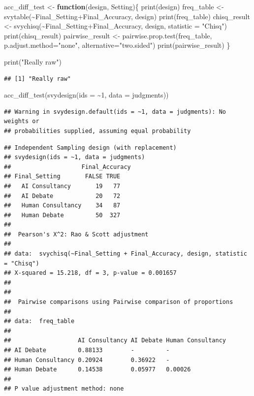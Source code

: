 \documentclass[
]{article}
\newenvironment{Shaded}{\begin{snugshade}}{\end{snugshade}}
\newcommand{\AttributeTok}[1]{\textcolor[rgb]{0.77,0.63,0.00}{#1}}
\newcommand{\ControlFlowTok}[1]{\textcolor[rgb]{0.13,0.29,0.53}{\textbf{#1}}}
\newcommand{\DecValTok}[1]{\textcolor[rgb]{0.00,0.00,0.81}{#1}}
\newcommand{\FunctionTok}[1]{\textcolor[rgb]{0.00,0.00,0.00}{#1}}
\newcommand{\NormalTok}[1]{#1}
\newcommand{\OtherTok}[1]{\textcolor[rgb]{0.56,0.35,0.01}{#1}}
\newcommand{\SpecialCharTok}[1]{\textcolor[rgb]{0.00,0.00,0.00}{#1}}
\newcommand{\StringTok}[1]{\textcolor[rgb]{0.31,0.60,0.02}{#1}}
\begin{document}
\begin{Shaded}
\begin{Highlighting}[]
\NormalTok{acc\_diff\_test }\OtherTok{\textless{}{-}} \ControlFlowTok{function}\NormalTok{(design, Setting)\{}
  \FunctionTok{print}\NormalTok{(design)}
\NormalTok{  freq\_table }\OtherTok{\textless{}{-}} \FunctionTok{svytable}\NormalTok{(}\SpecialCharTok{\textasciitilde{}}\NormalTok{Final\_Setting}\SpecialCharTok{+}\NormalTok{Final\_Accuracy, design)}
  \FunctionTok{print}\NormalTok{(freq\_table)}
\NormalTok{  chisq\_result }\OtherTok{\textless{}{-}} \FunctionTok{svychisq}\NormalTok{(}\SpecialCharTok{\textasciitilde{}}\NormalTok{Final\_Setting}\SpecialCharTok{+}\NormalTok{Final\_Accuracy, design, }\AttributeTok{statistic =} \StringTok{"Chisq"}\NormalTok{)}
  \FunctionTok{print}\NormalTok{(chisq\_result)}
\NormalTok{  pairwise\_result }\OtherTok{\textless{}{-}} \FunctionTok{pairwise.prop.test}\NormalTok{(freq\_table, }\AttributeTok{p.adjust.method=}\StringTok{"none"}\NormalTok{, }\AttributeTok{alternative=}\StringTok{"two.sided"}\NormalTok{)}
  \FunctionTok{print}\NormalTok{(pairwise\_result)}
\NormalTok{\}}

\FunctionTok{print}\NormalTok{(}\StringTok{"Really raw"}\NormalTok{)}
\end{Highlighting}
\end{Shaded}

\begin{verbatim}
## [1] "Really raw"
\end{verbatim}

\begin{Shaded}
\begin{Highlighting}[]
\FunctionTok{acc\_diff\_test}\NormalTok{(}\FunctionTok{svydesign}\NormalTok{(}\AttributeTok{ids =} \SpecialCharTok{\textasciitilde{}}\DecValTok{1}\NormalTok{, }\AttributeTok{data =}\NormalTok{ judgments))}
\end{Highlighting}
\end{Shaded}

\begin{verbatim}
## Warning in svydesign.default(ids = ~1, data = judgments): No weights or
## probabilities supplied, assuming equal probability
\end{verbatim}

\begin{verbatim}
## Independent Sampling design (with replacement)
## svydesign(ids = ~1, data = judgments)
##                    Final_Accuracy
## Final_Setting       FALSE TRUE
##   AI Consultancy       19   77
##   AI Debate            20   72
##   Human Consultancy    34   87
##   Human Debate         50  327
## 
##  Pearson's X^2: Rao & Scott adjustment
## 
## data:  svychisq(~Final_Setting + Final_Accuracy, design, statistic = "Chisq")
## X-squared = 15.218, df = 3, p-value = 0.001657
## 
## 
##  Pairwise comparisons using Pairwise comparison of proportions 
## 
## data:  freq_table 
## 
##                   AI Consultancy AI Debate Human Consultancy
## AI Debate         0.88133        -         -                
## Human Consultancy 0.20924        0.36922   -                
## Human Debate      0.14538        0.05977   0.00026          
## 
## P value adjustment method: none
\end{verbatim}
\end{document}
